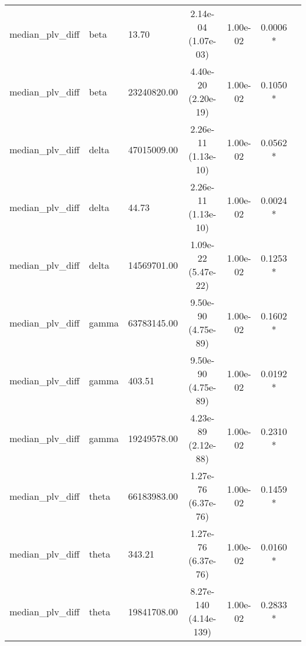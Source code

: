 \begin{tabular}{l l l c c c c}
    median\_plv\_diff & beta & 13.70 & 2.14e-04 (1.07e-03) & 1.00e-02 & 0.0006 * \\
    median\_plv\_diff & beta & 23240820.00 & 4.40e-20 (2.20e-19) & 1.00e-02 & 0.1050 * \\
    median\_plv\_diff & delta & 47015009.00 & 2.26e-11 (1.13e-10) & 1.00e-02 & 0.0562 * \\
    median\_plv\_diff & delta & 44.73 & 2.26e-11 (1.13e-10) & 1.00e-02 & 0.0024 * \\
    median\_plv\_diff & delta & 14569701.00 & 1.09e-22 (5.47e-22) & 1.00e-02 & 0.1253 * \\
    median\_plv\_diff & gamma & 63783145.00 & 9.50e-90 (4.75e-89) & 1.00e-02 & 0.1602 * \\
    median\_plv\_diff & gamma & 403.51 & 9.50e-90 (4.75e-89) & 1.00e-02 & 0.0192 * \\
    median\_plv\_diff & gamma & 19249578.00 & 4.23e-89 (2.12e-88) & 1.00e-02 & 0.2310 * \\
    median\_plv\_diff & theta & 66183983.00 & 1.27e-76 (6.37e-76) & 1.00e-02 & 0.1459 * \\
    median\_plv\_diff & theta & 343.21 & 1.27e-76 (6.37e-76) & 1.00e-02 & 0.0160 * \\
    median\_plv\_diff & theta & 19841708.00 & 8.27e-140 (4.14e-139) & 1.00e-02 & 0.2833 * \\
    \bottomrule
\end{tabular}